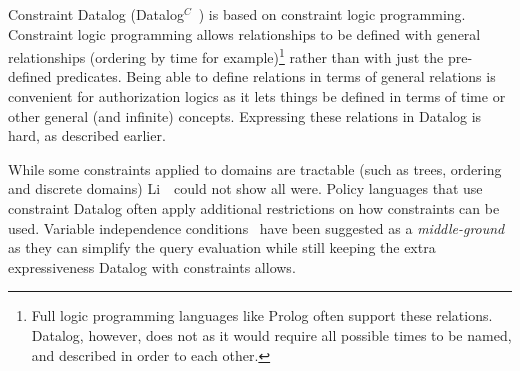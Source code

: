 \documentclass[thesis.tex]{subfiles}
\begin{document}
Constraint Datalog (Datalog$^C$~\cite{Li:2003ix}) is based
on constraint logic programming.  Constraint logic programming allows
relationships to be defined with general relationships (ordering by time
for example)\footnote{Full logic programming languages like Prolog often
support these relations. Datalog, however, does not as it would require all
possible times to be named, and described in order to each other.} rather than with just the pre-defined predicates.  Being able to
define relations in terms of general relations is convenient for
authorization logics as it lets things be defined in terms of time or
other general (and infinite) concepts. 
Expressing these relations in Datalog is hard, as described earlier.

While some constraints applied to domains are tractable (such as
trees, ordering and discrete domains) Li~\etal{}~could not show
all were.  Policy languages that use constraint Datalog often apply
additional restrictions on how constraints can be used.  Variable independence
conditions~\cite{Chomicki:2000tz} have been suggested as a \emph{middle-ground}
as they can simplify the query evaluation while still keeping the extra
expressiveness Datalog with constraints allows.

\end{document}
